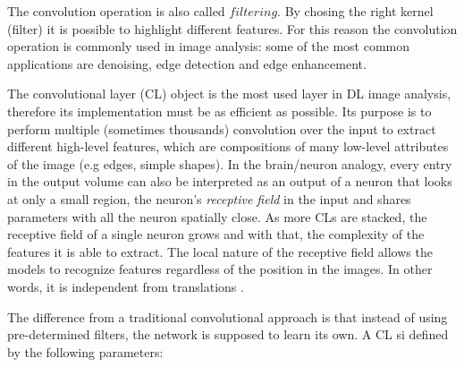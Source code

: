 \documentclass[12pt,a4paper]{report}
\begin{document}
The convolution operation is also called $filtering$. By chosing the right kernel (filter) it is possible to highlight different features. For this reason the convolution operation is commonly used in image analysis: some of the most common applications are denoising, edge detection and edge enhancement. 

The convolutional layer (CL) object is the most used layer in DL image analysis, therefore its implementation must be as efficient as possible.
Its purpose is to perform multiple (sometimes thousands) convolution over the input to extract different high-level features, which are compositions of many low-level attributes of the image (e.g edges, simple shapes).
In the brain/neuron analogy, every entry in the output volume can also be interpreted as an output of a neuron that looks at only a small region, the neuron's {\it receptive field} in the input and shares parameters with all the neuron spatially close.
As more CLs are stacked, the receptive field of a single neuron grows and with that, the complexity of the features it is able to extract.
The local nature of the receptive field allows the models to recognize features regardless of the position in the images. In other words, it is independent from translations \cite{Goodfellow-et-al-2016}. 

The difference from a traditional convolutional approach is that instead of using pre-determined filters, the network is supposed to learn its own.
A CL si defined by the following parameters: 
\end{document}
